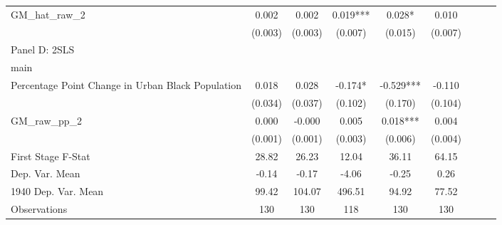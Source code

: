 \begin{tabular}{l*{8}{c}}
\addlinespace
GM\_hat\_raw\_2    &    0.002   &    0.002   &    0.019***&    0.028*  &    0.010   \\
                &  (0.003)   &  (0.003)   &  (0.007)   &  (0.015)   &  (0.007)   \\
\cmidrule(lr){1-6}
\multicolumn{5}{l}{Panel D: 2SLS}\\
\cmidrule(lr){1-6}
main            &            &            &            &            &            \\
Percentage Point Change in Urban Black Population&    0.018   &    0.028   &   -0.174*  &   -0.529***&   -0.110   \\
                &  (0.034)   &  (0.037)   &  (0.102)   &  (0.170)   &  (0.104)   \\
\addlinespace
GM\_raw\_pp\_2     &    0.000   &   -0.000   &    0.005   &    0.018***&    0.004   \\
                &  (0.001)   &  (0.001)   &  (0.003)   &  (0.006)   &  (0.004)   \\
\midrule
First Stage F-Stat&    28.82   &    26.23   &    12.04   &    36.11   &    64.15   \\
Dep. Var. Mean  &    -0.14   &    -0.17   &    -4.06   &    -0.25   &     0.26   \\
1940 Dep. Var. Mean&    99.42   &   104.07   &   496.51   &    94.92   &    77.52   \\
Observations    &      130   &      130   &      118   &      130   &      130   \\
 \bottomrule \end{tabular}

